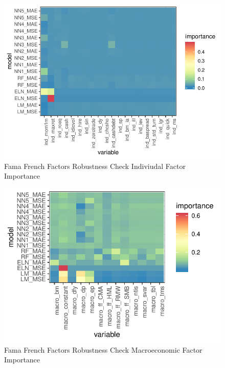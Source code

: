 \documentclass[11pt, a4paper, table]{article}
\begin{document}
\begin{figure}
	\includegraphics[]{../Results/empirical_ff/empirical_all_sample_vi_ind.pdf}
	\caption{Fama French Factors Robustness Check Indiviudal Factor Importance}
\end{figure}

\begin{figure}
	\includegraphics[]{../Results/empirical_ff/empirical_sample_all_vi_macro.pdf}
	\caption{Fama French Factors Robustness Check Macroeconomic Factor Importance}
\end{figure}

\end{document}
